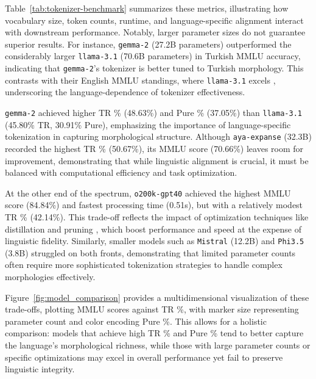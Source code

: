 Table~\ref{tab:tokenizer-benchmark} summarizes these metrics, illustrating how vocabulary size, token counts, runtime, and language-specific alignment interact with downstream performance. Notably, larger parameter sizes do not guarantee superior results. For instance, \texttt{gemma-2} (27.2B parameters) outperformed the considerably larger \texttt{llama-3.1} (70.6B parameters) in Turkish MMLU accuracy, indicating that \texttt{gemma-2}’s tokenizer is better tuned to Turkish morphology. This contrasts with their English MMLU standings, where \texttt{llama-3.1} excels \cite{ai_llama_nodate}, underscoring the language-dependence of tokenizer effectiveness.

\texttt{gemma-2} achieved higher TR \% (48.63\%) and Pure \% (37.05\%) than \texttt{llama-3.1} (45.80\% TR, 30.91\% Pure), emphasizing the importance of language-specific tokenization in capturing morphological structure. Although \texttt{aya-expanse} (32.3B) recorded the highest TR \% (50.67\%), its MMLU score (70.66\%) leaves room for improvement, demonstrating that while linguistic alignment is crucial, it must be balanced with computational efficiency and task optimization.

At the other end of the spectrum, \texttt{o200k-gpt40} achieved the highest MMLU score (84.84\%) and fastest processing time (0.51s), but with a relatively modest TR \% (42.14\%). This trade-off reflects the impact of optimization techniques like distillation and pruning \cite{lacy_gpt-4o_2024,shakrapani_gpt_nodate}, which boost performance and speed at the expense of linguistic fidelity. Similarly, smaller models such as \texttt{Mistral} (12.2B) and \texttt{Phi3.5} (3.8B) struggled on both fronts, demonstrating that limited parameter counts often require more sophisticated tokenization strategies to handle complex morphologies effectively.


Figure~\ref{fig:model_comparison} provides a multidimensional visualization of these trade-offs, plotting MMLU scores against TR \%, with marker size representing parameter count and color encoding Pure \%. This allows for a holistic comparison: models that achieve high TR \% and Pure \% tend to better capture the language’s morphological richness, while those with large parameter counts or specific optimizations may excel in overall performance yet fail to preserve linguistic integrity.


